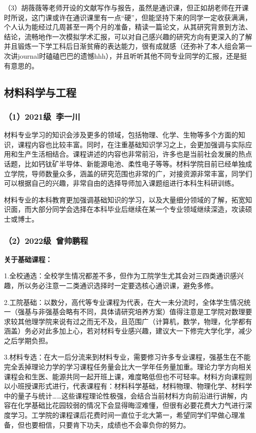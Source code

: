 \documentclass[11pt,oneside]{book}
\begin{document}
（3）胡薇薇等老师开设的文献写作与报告，虽然是通识课，但正如胡老师在开课时所说，这门课或许在通识课里有一点“硬”，但能坚持下来的同学一定收获满满，个人认为能经过几周甚至一两个月的准备，精读一篇论文，从其研究背景到方法、结论，流畅地作一次模拟学术汇报，可以对自己感兴趣的研究方向有更深入的了解并且锻炼一下学工科后日渐贫瘠的表达能力，很有成就感（还弥补了本人组会第一次讲journal时磕磕巴巴的遗憾hhh），并且听听其他不同专业同学的汇报，还是挺有意思的。  

\subsection{材料科学与工程}
\subsubsection{（1）2021级\ 李一川}
材料专业学习的知识会涉及更多的领域，包括物理、化学、生物等多个方面的知识，课程内容也比较丰富。同时，在注重基础知识学习之上，会更加强调与实际应用和生产生活相结合。课程讲述的内容也非常前沿，许多也是当前社会发展的热点话题，比如钙钛矿半导体、新能源电池、柔性电子等等。材料学院目前已经单独成立学院，导师数量众多，涵盖的研究范围也非常的广，对接资源非常丰富，同学们可以根据自己的兴趣，非常自由的选择导师加入课题组进行本科生科研训练。

\vspace{10pt}

材料专业的本科教育更加强调基础知识的学习，以及大量细分领域的了解，拓宽知识面，而大部分同学会选择在本科毕业后继续在某一个专业领域继续深造，攻读硕士或博士。
\subsubsection{（2）2022级\ 曾帅鹏程}
\textbf{关于基础课程：}

1.全校通选：全校学生情况都差不多，但作为工院学生尤其会对三四类通识感兴趣，所以务必注意一二类通识选择时一定要选核心通识课，避免多修。

\vspace{10pt}

2.工院基础：以数分，高代等专业课程为代表，在大一未分流时，全体学生情况统一（强基与非强基会略有不同，具体请研究培养方案）值得注意是工学院对数理要求较其他理学院来说有过之而无不及，且范围广（计算机，数学，物理，化学都有涵盖）务必对此多加上心，若对材料专业感兴趣，建议大一下修完大学化学，减少之后学期负担。

\vspace{10pt}

3.材料专选：在大一后分流来到材料专业，需要修习许多专业课程，强基生在不能完全丢掉理论力学的学习课程任务量会比大一学年任务量加重。理论力学方向相关课程会和生医、能源共同一起开班上课，难度略低但也不可轻率。材料方向课程则以小班授课形式进行，代表课程有：材料科学基础，材料物理、物理化学、材料学中的量子与统计……这些课程理论性极强，会结合当前材料方向前沿进行讲解，内容在化学基础比花园较弱的情况下会显得晦涩难懂，但很有必要花费大力气进行深度学习。工学院的课程课后花费时间一直位于北大第一，希望同学们早做心理准备，但也要相信，只要肯下功夫，成绩也不会辜负你的努力。
\end{document}
